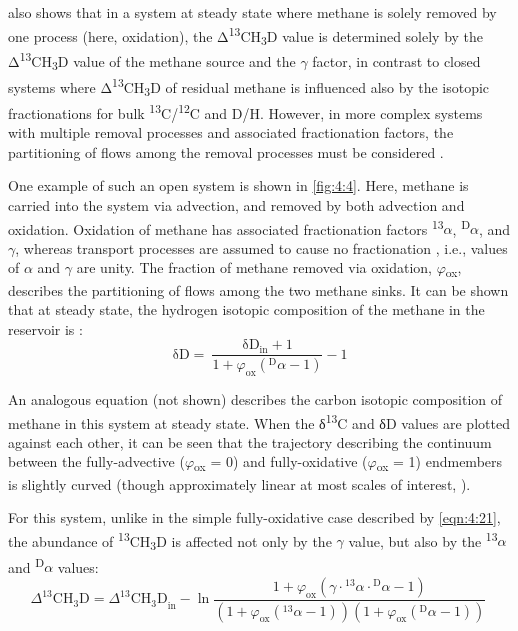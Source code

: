  also shows that in a system at steady state where methane is
solely removed by one process (here, oxidation), the
Δ\textsuperscript{13}CH\textsubscript{3}D value is determined solely by
the Δ\textsuperscript{13}CH\textsubscript{3}D value of the methane
source and the $\gamma$ factor, in contrast to closed systems where
Δ\textsuperscript{13}CH\textsubscript{3}D of residual methane is
influenced also by the isotopic fractionations for bulk
\textsuperscript{13}C/\textsuperscript{12}C and D/H. However, in more
complex systems with multiple removal processes and associated
fractionation factors, the partitioning of flows among the removal
processes must be considered \parencite{Hayes_2001_RiMG}.

One example of such an open system is shown in \autoref{fig:4:4}. Here, methane is
carried into the system via advection, and removed by both advection and
oxidation. Oxidation of methane has associated fractionation factors
\textsuperscript{13}$\alpha$, \textsuperscript{D}$\alpha$, and $\gamma$, whereas transport
processes are assumed to cause no fractionation \parencite{Alperin++_1988_GBC},
i.e., values of $\alpha$ and $\gamma$ are unity. The fraction of methane removed via
oxidation, $\varphi$\textsubscript{ox}, describes the partitioning of flows
among the two methane sinks. It can be shown that at steady state, the
hydrogen isotopic composition of the methane in the reservoir is \parencite{Hayes_2001_RiMG}:
\begin{equation}\label{eqn:4:22}
\mathrm{\text{δD}} = \ \frac{\mathrm{\text{δD}}_{\mathrm{\text{in}}} + 1}{1 + \varphi_{\mathrm{\text{ox}}}\left({}_{}^{\mathrm{D}}\alpha - 1 \right)} - 1
\end{equation}

An analogous equation (not shown) describes the carbon isotopic
composition of methane in this system at steady state. When the
δ\textsuperscript{13}C and δD values are plotted against each other, it
can be seen that the trajectory describing the continuum between the
fully-advective ($\varphi$\textsubscript{ox} = 0) and fully-oxidative
($\varphi$\textsubscript{ox} = 1) endmembers is slightly curved (though
approximately linear at most scales of interest, ).

For this system, unlike in the simple fully-oxidative case described by \autoref{eqn:4:21}, the abundance of \textsuperscript{13}CH\textsubscript{3}D is affected not only by the $\gamma$ value, but also by
the \textsuperscript{13}$\alpha$ and \textsuperscript{D}$\alpha$ values:
\begin{equation}\label{eqn:4:23}
\Delta_{}^{\mathrm{13}}{\mathrm{C}\mathrm{H}_{\mathrm{3}}\mathrm{D}} = {\Delta_{}^{\mathrm{13}}{\mathrm{C}\mathrm{H}_{\mathrm{3}}\mathrm{D}}}_{\mathrm{\text{in}}} - \ln\frac{1 + \varphi_{\mathrm{\text{ox}}}\left( \gamma \cdot{}_{}^{13}\alpha \cdot{}_{}^{\mathrm{D}}\alpha - 1 \right)}{\left( 1 + \varphi_{\mathrm{\text{ox}}}\left({}_{}^{13}\alpha - 1 \right) \right)\left( 1 + \varphi_{\mathrm{\text{ox}}}\left({}_{}^{\mathrm{D}}\alpha - 1 \right) \right)}\ 
\end{equation}

